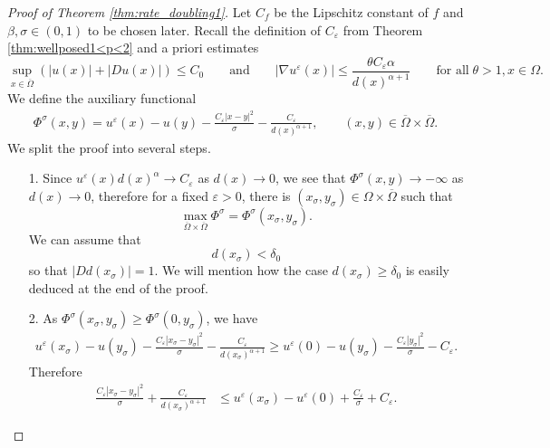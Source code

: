 \documentclass[11pt,reqno]{amsart}
\numberwithin{figure}{section}
\theoremstyle{plain}
\theoremstyle{remark}
\numberwithin{equation}{section}
\begin{document}
\begin{proof}[Proof of Theorem \ref{thm:rate_doubling1}] Let $C_f$ be the Lipschitz constant of $f$ and $\beta,\sigma \in (0,1)$ to be chosen later. Recall the definition of $C_\varepsilon$ from Theorem \ref{thm:wellposed1<p<2} and a priori estimates 
\begin{equation}\label{e:priori}
    \sup_{x\in \overline{\Omega}} \left(|u(x)| + |Du(x)|\right) \leq C_0 \qquad\text{and}\qquad |\nabla u^\varepsilon(x)| \leq \frac{\theta C_\varepsilon \alpha}{d(x)^{\alpha+1}} \qquad\text{for all}\;\theta > 1, x\in \Omega.
\end{equation}
We define the auxiliary functional
\begin{align*}
    \Phi^{\sigma}(x,y) =  u^\varepsilon(x) - u(y) - \frac{C_\varepsilon|x-y |^2}{\sigma}- \frac{C_\varepsilon}{d(x)^{\alpha+1}}, \qquad (x,y)\in \overline{\Omega}\times\overline{\Omega}
    .
\end{align*}
We split the proof into several steps.
\begin{enumerate}
    \item[1.] Since $u^\varepsilon (x)d(x)^\alpha \to C_\varepsilon$ as $d(x)\to 0$, we see that $\Phi^\sigma(x,y)\to -\infty$ as $d(x)\to 0$, therefore for a fixed $\varepsilon>0$, there is $(x_{\sigma},y_\sigma)\in \Omega\times\overline{\Omega}$ such that 
    \begin{equation*}
        \max_{\overline{\Omega}\times \overline{\Omega}} \Phi^\sigma = \Phi^\sigma(x_\sigma,y_\sigma).
    \end{equation*}
    We can assume that 
    \begin{equation}\label{e:ass_delta0}
        d(x_\sigma) < \delta_0
    \end{equation}
    so that $|Dd(x_\sigma)| = 1$. We will mention how the case $d(x_\sigma)\geq \delta_0$ is easily deduced at the end of the proof.
    \item[2.] As $\Phi^\sigma(x_\sigma,y_\sigma)\geq \Phi^\sigma(0,y_\sigma)$, we have
    \begin{align*}
        u^\varepsilon(x_\sigma) - u(y_\sigma) - \frac{C_\varepsilon |x_\sigma-y_\sigma|^2}{\sigma} - \frac{C_\varepsilon}{d(x_\sigma)^{\alpha+1}} \geq u^\varepsilon(0) - u(y_\sigma) - \frac{C_\varepsilon |y_\sigma|^2}{\sigma} - C_\varepsilon.
    \end{align*}
    Therefore
    \begin{align*}
        \frac{C_\varepsilon |x_\sigma-y_\sigma|^2}{\sigma} + \frac{C_\varepsilon}{d(x_\sigma)^{\alpha+1}} 
        &\leq u^\varepsilon(x_\sigma) - u^\varepsilon(0) + \frac{C_\varepsilon }{\sigma} +C_\varepsilon.

\end{align*}
\end{enumerate}
\end{proof}
\end{document}
